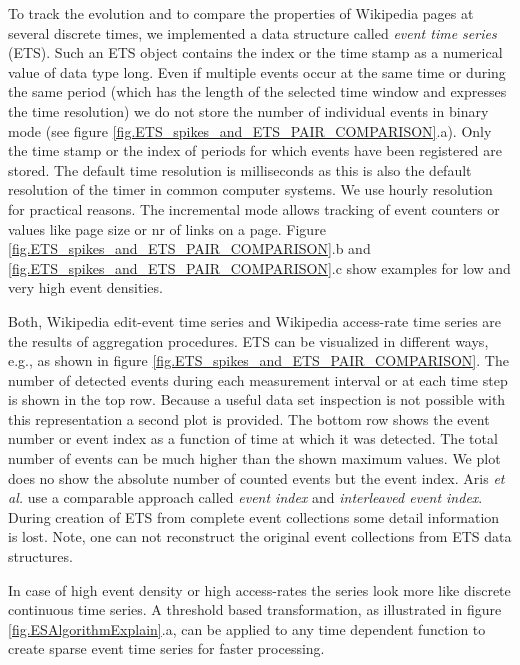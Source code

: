 \documentclass[a4paper,10pt]{scrbook}
\begin{document}
To track the evolution and to compare the properties of Wikipedia pages at several discrete times, we implemented a data structure called \emph{event time series} (ETS). Such an ETS object contains the index or the time stamp as a numerical value of data type long. Even if multiple events occur at the same time or during the same period (which has the length of the selected time window and expresses the time resolution) we do not store the number of individual events in binary mode (see figure \ref{fig.ETS_spikes_and_ETS_PAIR_COMPARISON}.a). Only the time stamp or the index of periods for which events have been registered are stored. The default time resolution is milliseconds as this is also the default resolution of the timer in common computer systems. We use hourly resolution for practical reasons. The incremental mode allows tracking of event counters or values like page size or nr of links on a page. Figure \ref{fig.ETS_spikes_and_ETS_PAIR_COMPARISON}.b and \ref{fig.ETS_spikes_and_ETS_PAIR_COMPARISON}.c show examples for low and very high event densities.   


Both, Wikipedia edit-event time series and Wikipedia access-rate time series are the results of aggregation procedures. ETS can be visualized in different ways, e.g., as shown in figure \ref{fig.ETS_spikes_and_ETS_PAIR_COMPARISON}. The number of detected events during each measurement interval or at each time step is shown in the top row. Because a useful data set inspection is not possible with this representation a second plot is provided. The bottom row shows the event number or event index as a function of time at which it was detected. The total number of events can be much higher than the shown maximum values. We plot does no show the absolute number of counted events but the event index. Aris \textit{et al.} \cite{Aris2005} use a comparable approach called \textit{event index} and \textit{interleaved event index}. During creation of ETS from complete event collections some detail information is lost. Note, one can not reconstruct the original event collections from ETS data structures.  

\label{ext.fig.ETS_spikes_and_ETS_PAIR_COMPARISON} 


In case of high event density or high access-rates the series look more like discrete continuous time series. A threshold based transformation, as illustrated in figure \ref{fig.ESAlgorithmExplain}.a, can be applied to any time dependent function to create sparse event time series for faster processing. 
\end{document}
